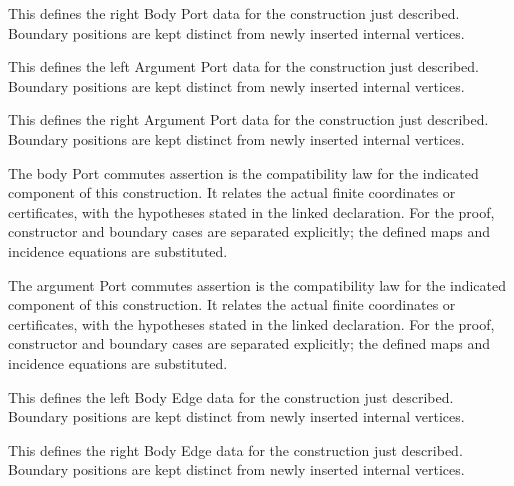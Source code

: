 This defines the right Body Port data for the construction just described. Boundary positions are kept distinct from newly inserted internal vertices.
\par{}

This defines the left Argument Port data for the construction just described. Boundary positions are kept distinct from newly inserted internal vertices.
\par{}

This defines the right Argument Port data for the construction just described. Boundary positions are kept distinct from newly inserted internal vertices.
\par{}

The body Port commutes assertion is the compatibility law for the indicated component of this construction. It relates the actual finite coordinates or certificates, with the hypotheses stated in the linked declaration.
For the proof, constructor and boundary cases are separated explicitly; the defined maps and incidence equations are substituted.
\par{}

The argument Port commutes assertion is the compatibility law for the indicated component of this construction. It relates the actual finite coordinates or certificates, with the hypotheses stated in the linked declaration.
For the proof, constructor and boundary cases are separated explicitly; the defined maps and incidence equations are substituted.
\par{}

This defines the left Body Edge data for the construction just described. Boundary positions are kept distinct from newly inserted internal vertices.
\par{}

This defines the right Body Edge data for the construction just described. Boundary positions are kept distinct from newly inserted internal vertices.
\par{}

